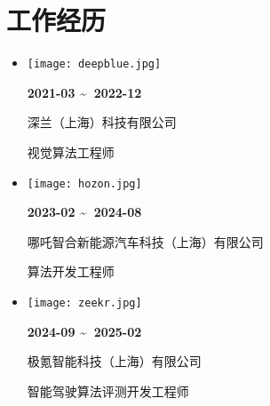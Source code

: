 \documentclass[11pt,a4paper]{article}
\begin{document}
\section*{工作经历}
\begin{itemize}[leftmargin=*,noitemsep,topsep=3pt]
    \item 
    \begin{minipage}[c]{0.1\textwidth}
        \texttt{[image: deepblue.jpg]}
    \end{minipage}%
    \hspace{0.5em}%
    \begin{minipage}[c]{0.18\textwidth}
        \textbf{2021-03 \textasciitilde\ 2022-12}
    \end{minipage}%
    \begin{minipage}[c]{0.45\textwidth}
        深兰（上海）科技有限公司
    \end{minipage}%
    \hfill%
    \begin{minipage}[c]{0.25\textwidth}
        \raggedleft 视觉算法工程师
    \end{minipage}
    
    \item 
    \begin{minipage}[c]{0.1\textwidth}
        \texttt{[image: hozon.jpg]}
    \end{minipage}%
    \hspace{0.5em}%
    \begin{minipage}[c]{0.18\textwidth}
        \textbf{2023-02 \textasciitilde\ 2024-08}
    \end{minipage}%
    \begin{minipage}[c]{0.45\textwidth}
        哪吒智合新能源汽车科技（上海）有限公司
    \end{minipage}%
    \hfill%
    \begin{minipage}[c]{0.25\textwidth}
        \raggedleft 算法开发工程师
    \end{minipage}
    
    \item 
    \begin{minipage}[c]{0.1\textwidth}
        \texttt{[image: zeekr.jpg]}
    \end{minipage}%
    \hspace{0.5em}%
    \begin{minipage}[c]{0.18\textwidth}
        \textbf{2024-09 \textasciitilde\ 2025-02}
    \end{minipage}%
    \begin{minipage}[c]{0.35\textwidth}
        极氪智能科技（上海）有限公司
    \end{minipage}%
    \hfill%
    \begin{minipage}[c]{0.35\textwidth}
        \raggedleft 智能驾驶算法评测开发工程师
    \end{minipage}
\end{itemize}
\end{document}
